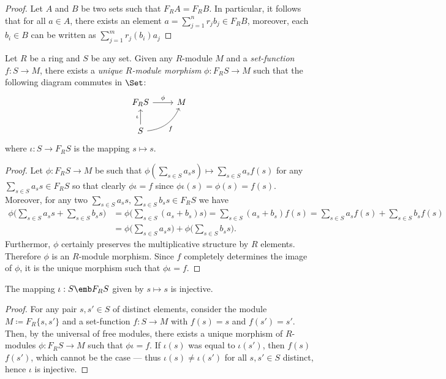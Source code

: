 \begin{proof}
Let \(A\) and \(B\) be two sets such that \(F_R A = F_R B\). In particular, it
follows that for all \(a \in A\), there exists an element \(a = \sum_{j=1}^n r_j
b_j \in F_R B\), moreover, each \(b_i \in B\) can be written as \(\sum_{j=1}^m
r_j(b_i) a_j\)
\end{proof}

\begin{proposition}
\label{prop:free-mod-univ-prop}
Let \(R\) be a ring and \(S\) be any set. Given any \(R\)-module \(M\) and a
\emph{set-function} \(f: S \to M\), there exists a \emph{unique \(R\)-module
  morphism} \(\phi: F_R S \to M\) such that the following diagram commutes in
\(\Set\):
\[
\begin{tikzcd}
F_R S \ar[r, "\phi"] &M \\
S \ar[u, "\iota"] \ar[ru, "f"', bend right] &
\end{tikzcd}
\]
where \(\iota: S \to F_R S\) is the mapping \(s \mapsto s\).
\end{proposition}

\begin{proof}
Let \(\phi: F_R S \to M\) be such that
\(\phi(\sum_{s \in S} a_s s) \mapsto \sum_{s \in S} a_s f(s)\) for any
\(\sum_{s \in S} a_s s \in F_R S\) so that clearly \(\phi \iota = f\) since
\(\phi \iota(s) = \phi(s) = f(s)\). Moreover, for any two
\(\sum_{s \in S} a_s s, \sum_{s \in S} b_s s \in F_R S\) we have
\begin{align*}
\phi\bigg( \sum_{s \in S} a_s s + \sum_{s \in S} b_s s \bigg)
&= \phi\bigg( \sum_{s \in S} (a_s + b_s) s \bigg)
= \sum_{s \in S} (a_s + b_s) f(s)
= \sum_{s \in S} a_s f(s) + \sum_{s \in S} b_s f(s) \\
&= \phi\bigg( \sum_{s \in S} a_s s \bigg)
+ \phi\bigg( \sum_{s \in S} b_s s \bigg).
\end{align*}
Furthermor, \(\phi\) certainly preserves the multiplicative structure by \(R\)
elements. Therefore \(\phi\) is an \(R\)-module morphism. Since \(f\) completely
determines the image of \(\phi\), it is the unique morphism such that
\(\phi \iota = f\).
\end{proof}

\begin{corollary}
\label{cor:set-to-module-injective}
The mapping \(\iota: S \emb F_R S\) given by \(s \mapsto s\) is injective.
\end{corollary}

\begin{proof}
For any pair \(s, s' \in S\) of distinct elements, consider the module
\(M \coloneq F_R \{s, s'\}\) and a set-function \(f: S \to M\) with \(f(s) = s\)
and \(f(s') = s'\). Then, by the universal of free modules, there exists a
unique morphism of \(R\)-modules \(\phi: F_R S \to M\) such that \(\phi \iota =
f\). If \(\iota(s)\) was equal to \(\iota(s')\), then \(f(s)\) \(f(s')\), which
cannot be the case --- thus \(\iota(s) \neq \iota(s')\) for all \(s, s' \in S\)
distinct, hence \(\iota\) is injective.
\end{proof}

